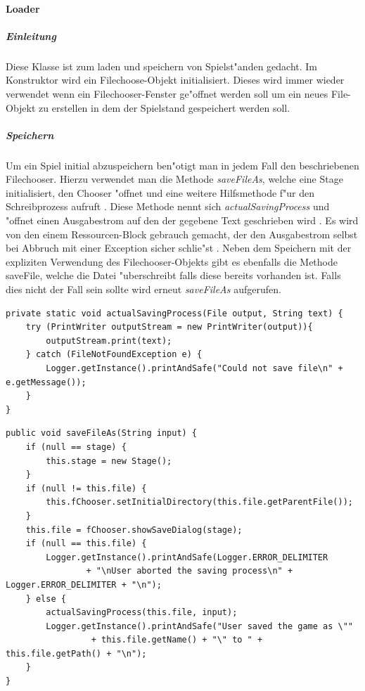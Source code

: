 \paragraph{Loader}
\label{par:loader}
\subparagraph{Einleitung}
Diese Klasse ist zum laden und speichern von Spielst"anden gedacht. Im Konstruktor wird ein Filechoose-Objekt initialisiert. Dieses wird immer wieder verwendet wenn ein Filechooser-Fenster ge"offnet werden soll um ein neues File-Objekt zu erstellen in dem der Spielstand gespeichert werden soll. 

\subparagraph{Speichern}
Um ein Spiel initial abzuspeichern ben"otigt man in jedem Fall den beschriebenen Filechooser. Hierzu verwendet man die Methode \emph{saveFileAs}, welche eine Stage initialisiert, den Chooser "offnet und eine weitere Hilfsmethode f"ur den Schreibprozess aufruft . Diese Methode nennt sich \emph{actualSavingProcess} und "offnet einen Ausgabestrom auf den der gegebene Text geschrieben wird . Es wird von den einem Ressourcen-Block gebrauch gemacht, der den Ausgabestrom selbst bei Abbruch mit einer Exception sicher schlie"st 
\cite{try-with-resources}. 
Neben dem Speichern mit der expliziten Verwendung des Filechooser-Objekts gibt es ebenfalls die Methode {saveFile}, welche die Datei "uberschreibt falls diese bereits vorhanden ist. Falls dies nicht der Fall sein sollte wird erneut \emph{saveFileAs} aufgerufen. 

\begin{lstlisting}[float,style=CodeHighlighting,caption=Loader - actualSavingProcess,label=lst:loader_actualSavingProcess]
private static void actualSavingProcess(File output, String text) {
    try (PrintWriter outputStream = new PrintWriter(output)){
        outputStream.print(text);
    } catch (FileNotFoundException e) {
        Logger.getInstance().printAndSafe("Could not save file\n" + e.getMessage());
    }
}
\end{lstlisting}

\begin{lstlisting}[float,style=CodeHighlighting,caption=Loader - saveFileAs,label=lst:loader_saveFileAs]
public void saveFileAs(String input) {
    if (null == stage) {
        this.stage = new Stage();
    }
    if (null != this.file) {
        this.fChooser.setInitialDirectory(this.file.getParentFile());
    }
    this.file = fChooser.showSaveDialog(stage);
    if (null == this.file) {
        Logger.getInstance().printAndSafe(Logger.ERROR_DELIMITER
                + "\nUser aborted the saving process\n" + Logger.ERROR_DELIMITER + "\n");
    } else {
        actualSavingProcess(this.file, input);
        Logger.getInstance().printAndSafe("User saved the game as \""
        		 + this.file.getName() + "\" to " + this.file.getPath() + "\n");
    }
}
\end{lstlisting}
